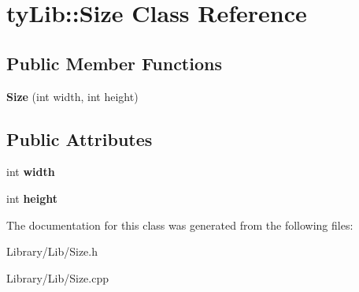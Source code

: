 \hypertarget{classty_lib_1_1_size}{}\section{ty\+Lib\+:\+:Size Class Reference}
\label{classty_lib_1_1_size}
\subsection*{Public Member Functions}
\begin{DoxyCompactItemize}
\item 
\hypertarget{classty_lib_1_1_size_af61cf00458a4a27fd9238e02bc2f8972}{}{\bfseries Size} (int width, int height)\label{classty_lib_1_1_size_af61cf00458a4a27fd9238e02bc2f8972}

\end{DoxyCompactItemize}
\subsection*{Public Attributes}
\begin{DoxyCompactItemize}
\item 
\hypertarget{classty_lib_1_1_size_a7275e31f61fad096b21ea76c16e09820}{}int {\bfseries width}\label{classty_lib_1_1_size_a7275e31f61fad096b21ea76c16e09820}

\item 
\hypertarget{classty_lib_1_1_size_a680bd9a8fd1956fc31e1d2f070c45223}{}int {\bfseries height}\label{classty_lib_1_1_size_a680bd9a8fd1956fc31e1d2f070c45223}

\end{DoxyCompactItemize}


The documentation for this class was generated from the following files\+:\begin{DoxyCompactItemize}
\item 
Library/\+Lib/Size.\+h\item 
Library/\+Lib/Size.\+cpp\end{DoxyCompactItemize}
